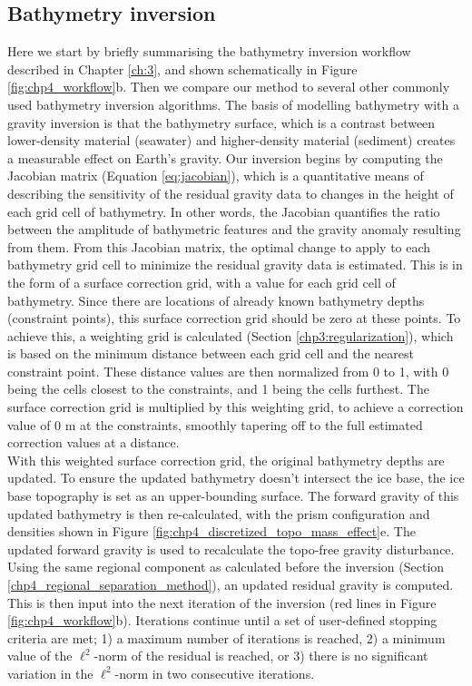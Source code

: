 \subsection{Bathymetry inversion} \label{ch4_inversion_method}

Here we start by briefly summarising the bathymetry inversion workflow described in Chapter \ref{ch:3}, and shown schematically in Figure \ref{fig:chp4_workflow}b. Then we compare our method to several other commonly used bathymetry inversion algorithms. The basis of modelling bathymetry with a gravity inversion is that the bathymetry surface, which is a contrast between lower-density material (seawater) and higher-density material (sediment) creates a measurable effect on Earth's gravity. Our inversion begins by computing the Jacobian matrix (Equation \ref{eq:jacobian}), which is a quantitative means of describing the sensitivity of the residual gravity data to changes in the height of each grid cell of bathymetry. In other words, the Jacobian quantifies the ratio between the amplitude of bathymetric features and the gravity anomaly resulting from them. From this Jacobian matrix, the optimal change to apply to each bathymetry grid cell to minimize the residual gravity data is estimated. This is in the form of a surface correction grid, with a value for each grid cell of bathymetry. Since there are locations of already known bathymetry depths (constraint points), this surface correction grid should be zero at these points. To achieve this, a weighting grid is calculated (Section \ref{chp3:regularization}), which is based on the minimum distance between each grid cell and the nearest constraint point. These distance values are then normalized from 0 to 1, with 0 being the cells closest to the constraints, and 1 being the cells furthest. The surface correction grid is multiplied by this weighting grid, to achieve a correction value of 0 m at the constraints, smoothly tapering off to the full estimated correction values at a distance.\\

With this weighted surface correction grid, the original bathymetry depths are updated. To ensure the updated bathymetry doesn't intersect the ice base, the ice base topography is set as an upper-bounding surface. The forward gravity of this updated bathymetry is then re-calculated, with the prism configuration and densities shown in Figure \ref{fig:chp4_discretized_topo_mass_effect}e. The updated forward gravity is used to recalculate the topo-free gravity disturbance. Using the same regional component as calculated before the inversion (Section \ref{chp4_regional_separation_method}), an updated residual gravity is computed. This is then input into the next iteration of the inversion (red lines in Figure \ref{fig:chp4_workflow}b). Iterations continue until a set of user-defined stopping criteria are met; 1) a maximum number of iterations is reached, 2) a minimum value of the $\ell^2$-norm of the residual is reached, or 3) there is no significant variation in the $\ell^2$-norm in two consecutive iterations.\\

